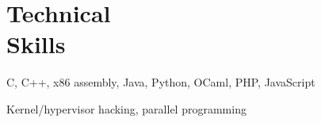 \section{Technical\\Skills}
C, C++, x86 assembly, Java, Python, OCaml, PHP, JavaScript

\bigskip

Kernel/hypervisor hacking, parallel programming

